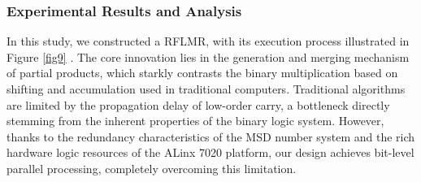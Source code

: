\documentclass[electronics,article,accept,pdftex,moreauthors]{Definitions/mdpi}
\begin{document}
\subsubsection{Experimental Results and Analysis}
In this study, we constructed a RFLMR, with its execution process illustrated in Figure \ref{fig9} . The core innovation lies in the generation and merging mechanism of partial products, which starkly contrasts the binary multiplication based on shifting and accumulation used in traditional computers. Traditional algorithms are limited by the propagation delay of low-order carry, a bottleneck directly stemming from the inherent properties of the binary logic system. However, thanks to the redundancy characteristics of the MSD number system and the rich hardware logic resources of the ALinx 7020 platform, our design achieves bit-level parallel processing, completely overcoming this limitation.
\end{document}
